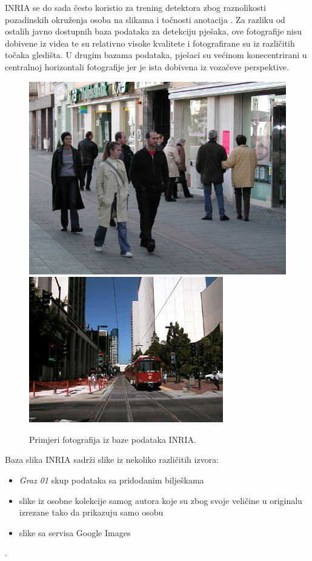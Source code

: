 \documentclass[seminar]{fer}
\begin{document}
INRIA se do sada često koristio za trening detektora zbog raznolikosti pozadinskih okruženja osoba na slikama i točnosti anotacija \cite{BenensonOHS14}. Za razliku od ostalih javno dostupnih baza podataka za detekciju pješaka, ove fotografije nisu dobivene iz videa te su relativno visoke kvalitete i fotografirane su iz različitih točaka gledišta. U drugim bazama podataka, pješaci su većinom konecentrirani u centralnoj horizontali fotografije jer je ista dobivena iz vozačeve perspektive.
\begin{figure}[h!]
\centering
\includegraphics[scale=1.7]{img/person_139.png}
\includegraphics[scale=0.5]{img/neg.png}
\caption{Primjeri fotografija iz baze podataka INRIA.}
\label{inria1}
\end{figure}

Baza slika INRIA sadrži slike iz nekoliko različitih izvora:
\begin{itemize}
\item \emph{Graz 01} skup podataka sa pridodanim bilješkama
\item slike iz osobne kolekcije samog autora koje su zbog svoje veličine u originalu izrezane tako da prikazuju samo osobu
\item slike sa servisa Google Images
\end{itemize}.
\end{document}
